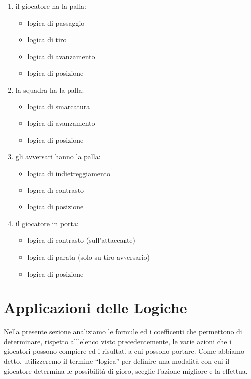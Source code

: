 \documentclass[aps,letterpaper,10pt]{article}
\begin{document}
\begin{enumerate}
	\item il giocatore ha la palla:
		\begin{itemize}
			\item logica di passaggio
			\item logica di tiro
			\item logica di avanzamento
			\item logica di posizione
		\end{itemize}
	\item la squadra ha la palla:
		\begin{itemize}
			\item logica di smarcatura
			\item logica di avanzamento
			\item logica di posizione
		\end{itemize}
	\item gli avversari hanno la palla:
		\begin{itemize}
			\item logica di indietreggiamento
			\item logica di contrasto
			\item logica di posizione
		\end{itemize}
	\item il giocatore in porta:
		\begin{itemize}
			\item logica di contrasto (sull'attaccante)
			\item logica di parata (solo su tiro avversario)
			\item logica di posizione
		\end{itemize}
\end{enumerate}

\newpage

\section{Applicazioni delle Logiche}

Nella presente sezione analiziamo le formule ed i coefficenti che permettono di determinare, rispetto all'elenco visto
precedentemente, le varie azioni che i giocatori possono compiere ed i risultati a cui possono portare. Come abbiamo
detto, utilizzeremo il termine ``logica'' per definire una modalit\`a con cui il giocatore determina le possibilit\`a di
gioco, sceglie l'azione migliore e la effettua. \vspace{3mm}
\end{document}
